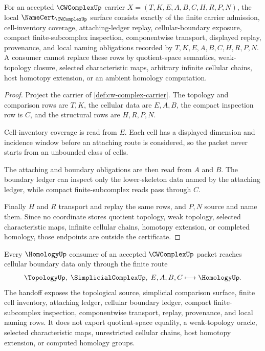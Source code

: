\begin{theorem}\label{thm:cw-complex-namecert-obligations}
For an accepted $\CWComplexUp$ carrier $X=(T,K,E,A,B,C,H,R,P,N)$, the local $\NameCert_{\CWComplexUp}$ surface consists exactly of the finite carrier admission, cell-inventory coverage, attaching-ledger replay, cellular-boundary exposure, compact finite-subcomplex inspection, componentwise transport, displayed replay, provenance, and local naming obligations recorded by $T,K,E,A,B,C,H,R,P,N$. A consumer cannot replace these rows by quotient-space semantics, weak-topology closure, selected characteristic maps, arbitrary infinite cellular chains, host homotopy extension, or an ambient homology computation.
\end{theorem}
\begin{proof}
Project the carrier of \autoref{def:cw-complex-carrier}. The topology and comparison rows are $T,K$, the cellular data are $E,A,B$, the compact inspection row is $C$, and the structural rows are $H,R,P,N$.

Cell-inventory coverage is read from $E$. Each cell has a displayed dimension and incidence window before an attaching route is considered, so the packet never starts from an unbounded class of cells.

The attaching and boundary obligations are then read from $A$ and $B$. The boundary ledger can inspect only the lower-skeleton data named by the attaching ledger, while compact finite-subcomplex reads pass through $C$.

Finally $H$ and $R$ transport and replay the same rows, and $P,N$ source and name them. Since no coordinate stores quotient topology, weak topology, selected characteristic maps, infinite cellular chains, homotopy extension, or completed homology, those endpoints are outside the certificate.
\end{proof}
\begin{theorem}\label{thm:cw-complex-cellular-boundary-handoff}
Every $\HomologyUp$ consumer of an accepted $\CWComplexUp$ packet reaches cellular boundary data only through the finite route
$$
\TopologyUp,\;\SimplicialComplexUp,\;E,A,B,C \longmapsto \HomologyUp .
$$
The handoff exposes the topological source, simplicial comparison surface, finite cell inventory, attaching ledger, cellular boundary ledger, compact finite-subcomplex inspection, componentwise transport, replay, provenance, and local naming rows. It does not export quotient-space equality, a weak-topology oracle, selected characteristic maps, unrestricted cellular chains, host homotopy extension, or computed homology groups.
\end{theorem}
